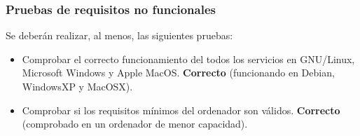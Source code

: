 \subsubsection{Pruebas de requisitos no funcionales}

Se deberán realizar, al menos, las siguientes pruebas:

\begin{itemize}
  \item Comprobar el correcto funcionamiento del todos los servicios en GNU/Linux,
	Microsoft Windows y Apple MacOS. \textbf{Correcto} (funcionando en Debian,
	WindowsXP y MacOSX).
  \item Comprobar si los requisitos mínimos del ordenador son válidos. \textbf{Correcto}
	(comprobado en un ordenador de menor capacidad).
\end{itemize}



